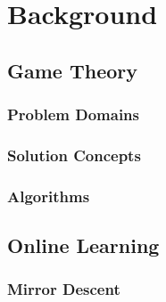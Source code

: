 \chapter{Background}

\section{Game Theory}
\subsection{Problem Domains}
\subsection{Solution Concepts}


\subsection{Algorithms}

\section{Online Learning}
\subsection{Mirror Descent}

